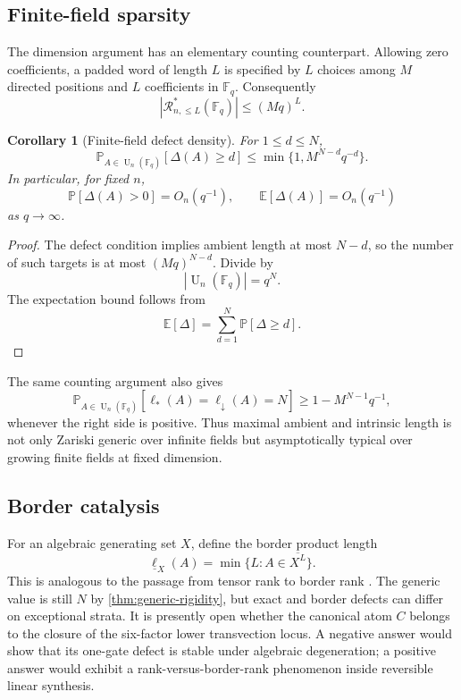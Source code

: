 \documentclass[11pt]{amsart}
\numberwithin{equation}{section}
\newtheorem{corollary}[theorem]{Corollary}
\theoremstyle{definition}
\theoremstyle{remark}
\newcommand{\F}{\mathbb F}
\newcommand{\U}{\operatorname{U}}
\newcommand{\ellDown}{\ell_{\downarrow}}
\newcommand{\ellAll}{\ell_{*}}
\newcommand{\DeltaDef}{\Delta}
\newcommand{\Prob}{\mathbb P}
\newcommand{\Exp}{\mathbb E}
\begin{document}
\subsection{Finite-field sparsity}

The dimension argument has an elementary counting counterpart.  Allowing zero coefficients, a padded word of length $L$ is specified by $L$ choices among $M$ directed positions and $L$ coefficients in $\F_q$.  Consequently
\[
|\mathcal R^*_{n,\le L}(\F_q)|\le(Mq)^L.
\]

\begin{corollary}[Finite-field defect density]\label{cor:finite-field-density}
For $1\le d\le N$,
\[
\Prob_{A\in\U_n(\F_q)}[\DeltaDef(A)\ge d]
\le
\min\{1,M^{N-d}q^{-d}\}.
\]
In particular, for fixed $n$,
\[
\Prob[\DeltaDef(A)>0]=O_n(q^{-1}),
\qquad
\Exp[\DeltaDef(A)]=O_n(q^{-1})
\]
as $q\to\infty$.
\end{corollary}

\begin{proof}
The defect condition implies ambient length at most $N-d$, so the number of such targets is at most $(Mq)^{N-d}$.  Divide by
\[
|\U_n(\F_q)|=q^N.
\]
The expectation bound follows from
\[
\Exp[\DeltaDef]=\sum_{d=1}^{N}\Prob[\DeltaDef\ge d].
\]
\end{proof}

The same counting argument also gives
\[
\Prob_{A\in\U_n(\F_q)}[\ellAll(A)=\ellDown(A)=N]
\ge
1-M^{N-1}q^{-1},
\]
whenever the right side is positive.  Thus maximal ambient and intrinsic length is not only Zariski generic over infinite fields but asymptotically typical over growing finite fields at fixed dimension.

\subsection{Border catalysis}

For an algebraic generating set $X$, define the border product length
\[
\underline\ell_X(A)
=
\min\{L:A\in\overline{X^L}\}.
\]
This is analogous to the passage from tensor rank to border rank \cite{Landsberg2012}.  The generic value is still $N$ by \cref{thm:generic-rigidity}, but exact and border defects can differ on exceptional strata.  It is presently open whether the canonical atom $C$ belongs to the closure of the six-factor lower transvection locus.  A negative answer would show that its one-gate defect is stable under algebraic degeneration; a positive answer would exhibit a rank-versus-border-rank phenomenon inside reversible linear synthesis.
\end{document}
